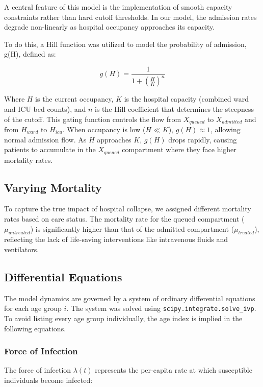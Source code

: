 \documentclass[10pt,twocolumn]{article}
\begin{document}
A central feature of this model is the implementation of smooth capacity constraints rather than hard cutoff thresholds. In our model, the admission rates degrade non-linearly as hospital occupancy approaches its capacity.

To do this, a Hill function was utilized to model the probability of admission, g(H), defined as:

$$g(H) = \frac{1}{1 + (\frac{H}{K})^n}$$

Where $H$ is the current occupancy, $K$ is the hospital capacity (combined ward and ICU bed counts), and $n$ is the Hill coefficient that determines the steepness of the cutoff. 
This gating function controls the flow from $X_{queued}$ to $X_{admitted}$ and from $H_{ward}$ to $H_{icu}$. 
When occupancy is low ($H \ll K$), $g(H) \approx 1$, allowing normal admission flow. 
As $H$ approaches $K$, $g(H)$ drops rapidly, causing patients to accumulate in the $X_{queued}$ compartment where they face higher mortality rates.


\subsection{Varying Mortality}

To capture the true impact of hospital collapse, we assigned different mortality rates based on care status. The mortality rate for the queued compartment ($\mu_{untreated}$) is significantly higher than that of the admitted compartment ($\mu_{treated}$), reflecting the lack of life-saving interventions like intravenous fluids and ventilators.


\subsection{Differential Equations}

The model dynamics are governed by a system of ordinary differential equations for each age group $i$. The system was solved using \texttt{scipy.integrate.solve\_ivp}. To avoid listing every age group individually, the age index is implied in the following equations.

\subsubsection{Force of Infection}

The force of infection $\lambda(t)$ represents the per-capita rate at which susceptible individuals become infected:
\end{document}
